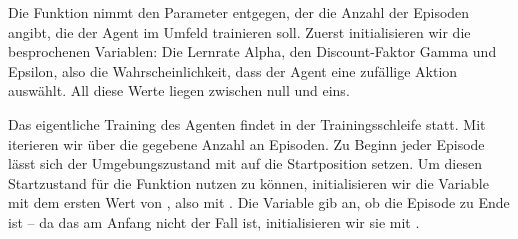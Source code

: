 
\PYTHON{}




\PYTHON{}




\PYTHON{}




\PYTHON{}




\medskip


Die Funktion  nimmt den Parameter  entgegen, der die Anzahl der Episoden angibt, die der Agent im Umfeld trainieren soll. Zuerst initialisieren wir die besprochenen Variablen: Die Lernrate Alpha, den Discount-Faktor Gamma und Epsilon, also die Wahrscheinlichkeit, dass der Agent eine zufällige Aktion auswählt. All diese Werte liegen zwischen null und eins.

Das eigentliche Training des Agenten findet in der Trainingsschleife statt. Mit  iterieren wir über die gegebene Anzahl an Episoden. Zu Beginn jeder Episode lässt sich der Umgebungszustand mit  auf die Startposition setzen. Um diesen Startzustand für die Funktion  nutzen zu können, initialisieren wir die Variable  mit dem ersten Wert von , also mit . Die Variable  gib an, ob die Episode zu Ende ist – da das am Anfang nicht der Fall ist, initialisieren wir sie mit .

